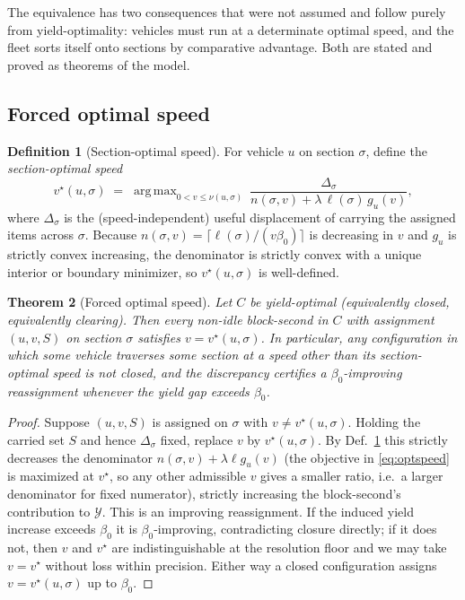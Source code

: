 \documentclass[11pt,twocolumn,a4paper]{article}
\newtheorem{theorem}{Theorem}[section]
\theoremstyle{definition}
\newtheorem{definition}[theorem]{Definition}
\theoremstyle{remark}
\newcommand{\yield}{\mathcal{Y}}
\newcommand{\blocktime}{\beta_0}
\DeclareMathOperator*{\argmax}{arg\,max}
\begin{document}
The equivalence has two consequences that were not assumed and follow purely from yield-optimality: vehicles must run at a determinate optimal speed, and the fleet sorts itself onto sections by comparative advantage. Both are stated and proved as theorems of the model.

\subsection{Forced optimal speed}

\begin{definition}[Section-optimal speed]
\label{def:optspeed}
For vehicle $u$ on section $\sigma$, define the \emph{section-optimal speed}
\begin{equation}
\label{eq:optspeed}
v^{\star}(u,\sigma) \;=\; \argmax_{0 < v \le \nu(u,\sigma)} \ \frac{\Delta_\sigma}{n(\sigma,v) + \lambda\,\ell(\sigma)\,g_u(v)},
\end{equation}
where $\Delta_\sigma$ is the (speed-independent) useful displacement of carrying the assigned items across $\sigma$. Because $n(\sigma,v)=\lceil \ell(\sigma)/(v\blocktime)\rceil$ is decreasing in $v$ and $g_u$ is strictly convex increasing, the denominator is strictly convex with a unique interior or boundary minimizer, so $v^\star(u,\sigma)$ is well-defined.
\end{definition}

\begin{theorem}[Forced optimal speed]
\label{thm:forcedspeed}
Let $C$ be yield-optimal (equivalently closed, equivalently clearing). Then every non-idle block-second in $C$ with assignment $(u,v,S)$ on section $\sigma$ satisfies $v = v^{\star}(u,\sigma)$. In particular, any configuration in which some vehicle traverses some section at a speed other than its section-optimal speed is \emph{not} closed, and the discrepancy certifies a $\blocktime$-improving reassignment whenever the yield gap exceeds $\blocktime$.
\end{theorem}

\begin{proof}
Suppose $(u,v,S)$ is assigned on $\sigma$ with $v\neq v^\star(u,\sigma)$. Holding the carried set $S$ and hence $\Delta_\sigma$ fixed, replace $v$ by $v^\star(u,\sigma)$. By Def.~\ref{def:optspeed} this strictly decreases the denominator $n(\sigma,v)+\lambda\ell g_u(v)$ (the objective in \eqref{eq:optspeed} is maximized at $v^\star$, so any other admissible $v$ gives a smaller ratio, i.e.\ a larger denominator for fixed numerator), strictly increasing the block-second's contribution to $\yield$. This is an improving reassignment. If the induced yield increase exceeds $\blocktime$ it is $\blocktime$-improving, contradicting closure directly; if it does not, then $v$ and $v^\star$ are indistinguishable at the resolution floor and we may take $v=v^\star$ without loss within precision. Either way a closed configuration assigns $v=v^\star(u,\sigma)$ up to $\blocktime$.
\end{proof}
\end{document}
